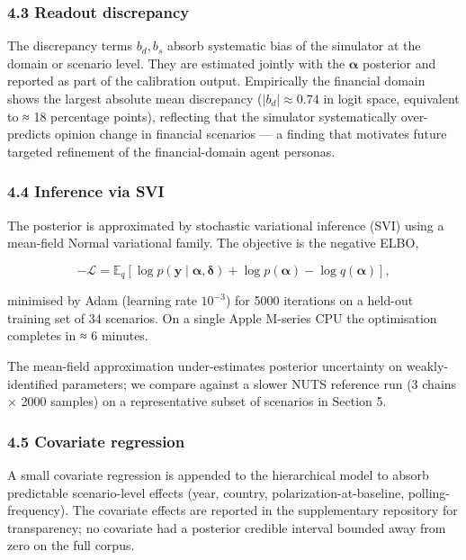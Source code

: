 \documentclass[
]{article}
\begin{document}
\subsubsection{4.3 Readout discrepancy}\label{readout-discrepancy}

The discrepancy terms \(b_d, b_s\) absorb systematic bias of the
simulator at the domain or scenario level. They are estimated jointly
with the \(\boldsymbol{\alpha}\) posterior and reported as part of the
calibration output. Empirically the financial domain shows the largest
absolute mean discrepancy (\(|b_d| \approx 0.74\) in logit space,
equivalent to ≈ 18 percentage points), reflecting that the simulator
systematically over-predicts opinion change in financial scenarios --- a
finding that motivates future targeted refinement of the
financial-domain agent personas.

\subsubsection{4.4 Inference via SVI}\label{inference-via-svi}

The posterior is approximated by stochastic variational inference (SVI)
using a mean-field Normal variational family. The objective is the
negative ELBO,

\[
-\mathcal{L} = \mathbb{E}_{q}[ \log p(\mathbf{y} \mid \boldsymbol{\alpha}, \boldsymbol{\delta}) + \log p(\boldsymbol{\alpha}) - \log q(\boldsymbol{\alpha})],
\]

minimised by Adam (learning rate \(10^{-3}\)) for 5000 iterations on a
held-out training set of 34 scenarios. On a single Apple M-series CPU
the optimisation completes in ≈ 6 minutes.

The mean-field approximation under-estimates posterior uncertainty on
weakly-identified parameters; we compare against a slower NUTS reference
run (3 chains × 2000 samples) on a representative subset of scenarios in
Section 5.

\subsubsection{4.5 Covariate regression}\label{covariate-regression}

A small covariate regression is appended to the hierarchical model to
absorb predictable scenario-level effects (year, country,
polarization-at-baseline, polling-frequency). The covariate effects are
reported in the supplementary repository for transparency; no covariate
had a posterior credible interval bounded away from zero on the full
corpus.
\end{document}
